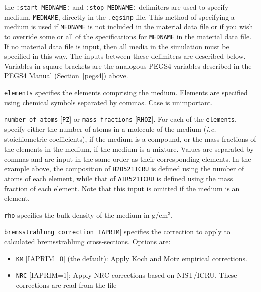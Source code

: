 \documentclass[12pt,twoside]{article}
\begin{document}
\begin{description}
\item the {\tt :start MEDNAME:} and {\tt :stop MEDNAME:} delimiters are used to specify medium, {\tt MEDNAME}, directly in the
{\tt .egsinp} file.  This method of specifying a medium is used if {\tt MEDNAME} is not included in the material data file or
if you wish to override some or all of the specifications for {\tt MEDNAME} in the material data file.
If no material data file is input, then all media in the simulation
must be specified in this way.  The inputs between these delimiters are described below.  Variables
in square brackets are the analogous PEGS4 variables described in the PEGS4 Manual (Section~\ref{pegs4}) above.
\begin{description}
\item {\tt elements} specifies the elements comprising the medium.  Elements are specified using chemical symbols separated by
commas.  Case is unimportant.
\item {\tt number of atoms} $[${\tt PZ}$]$ or {\tt mass fractions} $[${\tt RHOZ}$]$.  For each of the {\tt elements}, specify either the number of atoms in a molecule of the medium ({\it i.e.} stoichiometric coefficients), if the
medium is a compound, or the mass fractions of the elements in the medium,
if the medium is a mixture.
Values are separated by commas and are input in the same order as their corresponding elements.  In the example above,
the composition of {\tt H2O521ICRU} is
defined using the number of atoms of each element, while that of {\tt AIR521ICRU} is defined using the mass fraction of each element.  Note that this input
is omitted if the medium is an element.
\item {\tt rho} specifies the bulk density of the medium in g/cm$^3$.
\item {\tt bremsstrahlung correction} $[${\tt IAPRIM}$]$ specifies the
correction to apply to calculated bremsstrahlung cross-sections.
Options are:
\begin{itemize}
\item {\tt KM} $[$IAPRIM=0$]$ (the default): Apply Koch and Motz\cite{KM59} empirical corrections.
\item {\tt NRC} $[$IAPRIM=1$]$: Apply NRC corrections based on NIST/ICRU\cite{Ro89a}.  These corrections are read from the file

\end{itemize}
\end{description}
\end{description}
\end{document}
